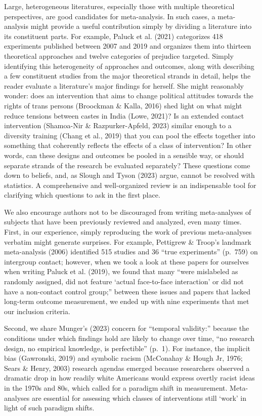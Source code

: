 \documentclass[
  ,jou]{apa6}
\begin{document}
Large, heterogeneous literatures, especially those with multiple theoretical perspectives, are good candidates for meta-analysis. In such cases, a meta-analysis might provide a useful contribution simply by dividing a literature into its constituent parts. For example, Paluck et al. (2021) categorizes 418 experiments published between 2007 and 2019 and organizes them into thirteen theoretical approaches and twelve categories of prejudice targeted. Simply identifying this heterogeneity of approaches and outcomes, along with describing a few constituent studies from the major theoretical strands in detail, helps the reader evaluate a literature's major findings for herself. She might reasonably wonder: does an intervention that aims to change political attitudes towards the rights of trans persons (Broockman \& Kalla, 2016) shed light on what might reduce tensions between castes in India (Lowe, 2021)? Is an extended contact intervention (Shamoa-Nir \& Razpurker-Apfeld, 2023) similar enough to a diversity training (Chang et al., 2019) that you can pool the effects together into something that coherently reflects the effects of a class of intervention? In other words, can these designs and outcomes be pooled in a sensible way, or should separate strands of the research be evaluated separately? These questions come down to beliefs, and, as Slough and Tyson (2023) argue, cannot be resolved with statistics. A comprehensive and well-organized review is an indispensable tool for clarifying which questions to ask in the first place.

We also encourage authors not to be discouraged from writing meta-analyses of subjects that have been previously reviewed and analyzed, even many times. First, in our experience, simply reproducing the work of previous meta-analyses verbatim might generate surprises. For example, Pettigrew \& Troop's landmark meta-analysis (2006) identified 515 studies and 36 ``true experiments'' (p.~759) on intergroup contact; however, when we took a look at these papers for ourselves when writing Paluck et al. (2019), we found that many ``were mislabeled as randomly assigned, did not feature `actual face-to-face interaction' or did not have a non-contact control group;'' between these issues and papers that lacked long-term outcome measurement, we ended up with nine experiments that met our inclusion criteria.

Second, we share Munger's (2023) concern for ``temporal validity:'' because the conditions under which findings hold are likely to change over time, ``no research design, no empirical knowledge, is perfectible'' (p.~1). For instance, the implicit bias (Gawronski, 2019) and symbolic racism (McConahay \& Hough Jr, 1976; Sears \& Henry, 2003) research agendas emerged because researchers observed a dramatic drop in how readily white Americans would express overtly racist ideas in the 1970s and 80s, which called for a paradigm shift in measurement. Meta-analyses are essential for assessing which classes of interventions still `work' in light of such paradigm shifts.
\end{document}
